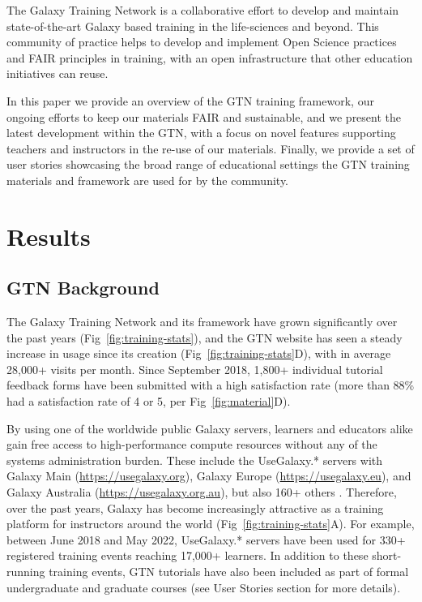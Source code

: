 The Galaxy Training Network is a collaborative effort to develop and maintain state-of-the-art Galaxy based training in the life-sciences and beyond. This community of practice \cite{Li_2009} helps to develop and implement Open Science practices and FAIR principles in training, with an open infrastructure that other education initiatives can reuse.

In this paper we provide an overview of the GTN training framework, our ongoing efforts to keep our materials FAIR and sustainable, and we present the latest development within the GTN, with a focus on novel features supporting teachers and instructors in the re-use of our materials. Finally, we provide a set of user stories showcasing the broad range of educational settings the GTN training materials and framework are used for by the community.  

\section*{Results}

\subsection*{GTN Background}

The Galaxy Training Network and its framework have grown significantly over the past years (Fig~\ref{fig:training-stats}), and the GTN website has seen a steady increase in usage since its creation (Fig~\ref{fig:training-stats}D), with in average 28,000+ visits per month. Since September 2018, 1,800+ individual tutorial feedback forms have been submitted with a high satisfaction rate (more than 88\% had a satisfaction rate of 4 or 5, per Fig~\ref{fig:material}D). 

By using one of the worldwide public Galaxy servers, learners and educators alike gain free access to high-performance compute resources without any of the systems administration burden. These include the UseGalaxy.* servers with Galaxy Main (\url{https://usegalaxy.org}), Galaxy Europe (\url{https://usegalaxy.eu}), and Galaxy Australia (\url{https://usegalaxy.org.au}), but also 160+ others \cite{galaxy-use}. 
Therefore, over the past years, Galaxy has become increasingly attractive as a training platform for instructors around the world \cite{galaxy-hub} (Fig~\ref{fig:training-stats}A). For example, between June 2018 and May 2022, UseGalaxy.* servers have been used for 330+ registered training events reaching 17,000+ learners. 
In addition to these short-running training events, GTN tutorials have also been included as part of formal undergraduate and graduate courses (see User Stories section for more details). 




